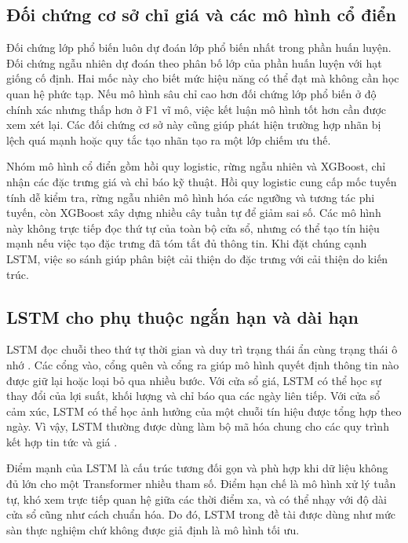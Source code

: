 \subsection{Đối chứng cơ sở chỉ giá và các mô hình cổ điển}

Đối chứng lớp phổ biến luôn dự đoán lớp phổ biến nhất trong phần huấn luyện. Đối chứng
ngẫu nhiên dự đoán theo phân bố lớp của phần huấn luyện với hạt giống cố định. Hai mốc này cho
biết mức hiệu năng có thể đạt mà không cần học quan hệ phức tạp. Nếu mô hình sâu chỉ
cao hơn đối chứng lớp phổ biến ở độ chính xác nhưng thấp hơn ở F1 vĩ mô, việc kết luận mô hình tốt hơn
cần được xem xét lại. Các đối chứng cơ sở này cũng giúp phát hiện trường hợp nhãn bị lệch
quá mạnh hoặc quy tắc tạo nhãn tạo ra một lớp chiếm ưu thế.

Nhóm mô hình cổ điển gồm hồi quy logistic, rừng ngẫu nhiên và XGBoost, chỉ nhận các
đặc trưng giá và chỉ báo kỹ thuật. Hồi quy logistic cung cấp mốc tuyến tính dễ kiểm
tra, rừng ngẫu nhiên mô hình hóa các ngưỡng và tương tác phi tuyến, còn XGBoost xây dựng
nhiều cây tuần tự để giảm sai số. Các mô hình này không trực tiếp đọc thứ tự của toàn
bộ cửa sổ, nhưng có thể tạo tín hiệu mạnh nếu việc tạo đặc trưng đã tóm tắt đủ
thông tin. Khi đặt chúng cạnh LSTM, việc so sánh giúp phân biệt cải thiện do đặc trưng
với cải thiện do kiến trúc.

\subsection{LSTM cho phụ thuộc ngắn hạn và dài hạn}

LSTM đọc chuỗi theo thứ tự thời gian và duy trì trạng thái ẩn cùng trạng thái ô nhớ
\cite{Hochreiter1997_lstm}.
Các cổng vào, cổng quên và cổng ra giúp mô hình quyết định thông tin nào được giữ lại
hoặc loại bỏ qua nhiều bước. Với cửa sổ giá, LSTM có thể học sự thay đổi của lợi suất,
khối lượng và chỉ báo qua các ngày liên tiếp. Với cửa sổ cảm xúc, LSTM có thể học
ảnh hưởng của một chuỗi tín hiệu được tổng hợp theo ngày. Vì vậy, LSTM thường được
dùng làm bộ mã hóa chung cho các quy trình kết hợp tin tức và giá
\cite{Halder2022_221107392v1,Gu2024_240716150v1}.

Điểm mạnh của LSTM là cấu trúc tương đối gọn và phù hợp khi dữ liệu không đủ lớn cho
một Transformer nhiều tham số. Điểm hạn chế là mô hình xử lý tuần tự, khó xem trực
tiếp quan hệ giữa các thời điểm xa, và có thể nhạy với độ dài cửa sổ cũng như cách
chuẩn hóa. Do đó, LSTM trong đề tài được dùng như mức sàn thực nghiệm chứ không được
giả định là mô hình tối ưu.

